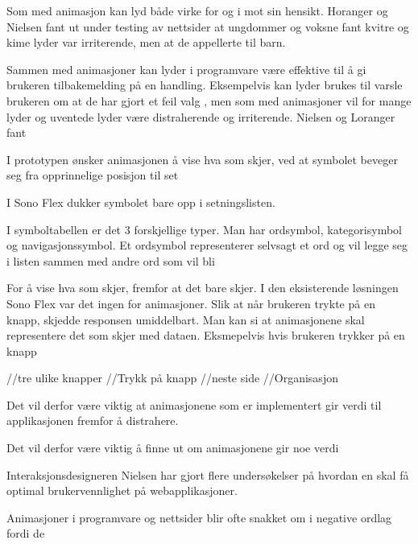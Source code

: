\documentclass[phd,tocprelim]{cornell}
\begin{document}
Som med animasjon kan lyd både virke for og i mot sin hensikt. Horanger og Nielsen fant ut under testing av nettsider at ungdommer og voksne fant kvitre og kime lyder var irriterende, men at de appellerte til barn. 

Sammen med animasjoner kan lyder i programvare være effektive til å gi brukeren tilbakemelding på en handling. Eksempelvis kan lyder brukes til varsle brukeren om at de har gjort et feil valg \cite{}, men som med animasjoner vil for mange lyder og uventede lyder være distraherende og irriterende. Nielsen og Loranger fant 























I prototypen ønsker animasjonen å vise hva som skjer,  ved at symbolet beveger seg fra opprinnelige posisjon til set

I Sono Flex dukker symbolet bare opp i setningslisten.

I symboltabellen er det 3 forskjellige typer. Man har 
ordsymbol, kategorisymbol og navigasjonssymbol. Et ordsymbol representerer selvsagt et ord og vil legge seg i listen sammen med andre ord som vil bli 

For å vise hva som skjer, fremfor at det bare skjer. I den eksisterende løsningen Sono Flex var det ingen for animasjoner. Slik at når brukeren trykte på en knapp, skjedde responsen umiddelbart. Man kan si at animasjonene skal representere det som skjer med dataen. Eksmepelvis hvis brukeren trykker på en knapp 


//tre ulike knapper
    //Trykk på knapp
    //neste side
    //Organisasjon



Det vil derfor være viktig at animasjonene som er implementert gir verdi til applikasjonen fremfor å distrahere.

Det vil derfor være viktig å finne ut om animasjonene gir noe verdi 

Interaksjonsdesigneren Nielsen har gjort flere undersøkelser på hvordan en skal få optimal brukervennlighet på webapplikasjoner. 

Animasjoner i programvare og nettsider blir ofte snakket om i negative ordlag fordi de
\end{document}
